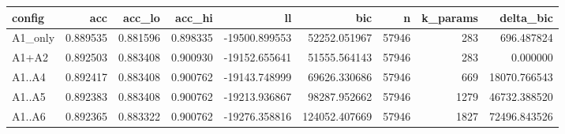 \begin{tabular}{lrrrrrrrr}
\toprule
config & acc & acc\_lo & acc\_hi & ll & bic & n & k\_params & delta\_bic \\
\midrule
A1\_only & 0.889535 & 0.881596 & 0.898335 & -19500.899553 & 52252.051967 & 57946 & 283 & 696.487824 \\
A1+A2 & 0.892503 & 0.883408 & 0.900930 & -19152.655641 & 51555.564143 & 57946 & 283 & 0.000000 \\
A1..A4 & 0.892417 & 0.883408 & 0.900762 & -19143.748999 & 69626.330686 & 57946 & 669 & 18070.766543 \\
A1..A5 & 0.892383 & 0.883408 & 0.900762 & -19213.936867 & 98287.952662 & 57946 & 1279 & 46732.388520 \\
A1..A6 & 0.892365 & 0.883322 & 0.900762 & -19276.358816 & 124052.407669 & 57946 & 1827 & 72496.843526 \\
\bottomrule
\end{tabular}
